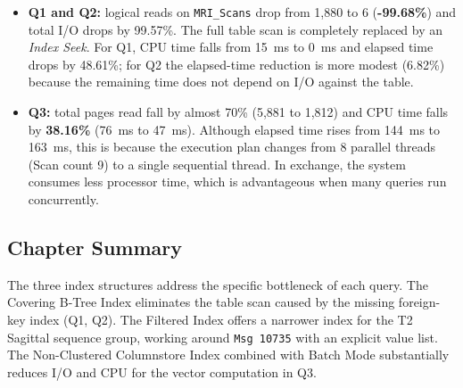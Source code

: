 \begin{itemize}
  \item \textbf{Q1 and Q2:} logical reads on \texttt{MRI\_Scans} drop from 1,880 to 6 (\textbf{-99.68\%}) and total I/O drops by 99.57\%. The full table scan is completely replaced by an \textit{Index Seek}. For Q1, CPU time falls from 15~ms to 0~ms and elapsed time drops by 48.61\%; for Q2 the elapsed-time reduction is more modest (6.82\%) because the remaining time does not depend on I/O against the table.
  \item \textbf{Q3:} total pages read fall by almost 70\% (5,881 to 1,812) and CPU time falls by \textbf{38.16\%} (76~ms to 47~ms). Although elapsed time rises from 144~ms to 163~ms, this is because the execution plan changes from 8 parallel threads (Scan count 9) to a single sequential thread. In exchange, the system consumes less processor time, which is advantageous when many queries run concurrently.
\end{itemize}

\subsection{Chapter Summary}

The three index structures address the specific bottleneck of each query. The Covering B-Tree Index eliminates the table scan caused by the missing foreign-key index (Q1, Q2). The Filtered Index offers a narrower index for the T2 Sagittal sequence group, working around \texttt{Msg 10735} with an explicit value list. The Non-Clustered Columnstore Index combined with Batch Mode substantially reduces I/O and CPU for the vector computation in Q3.